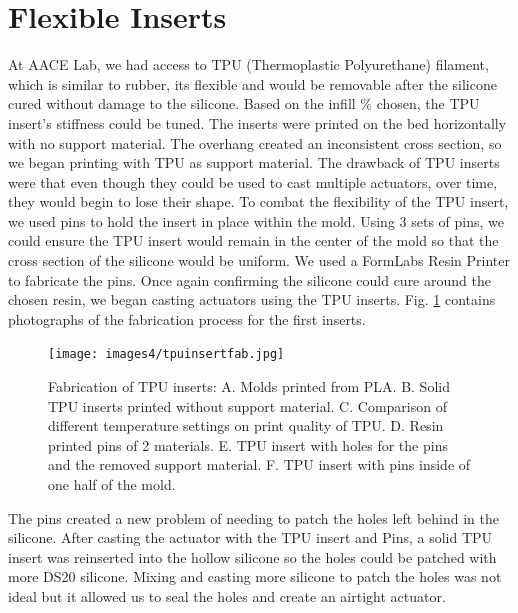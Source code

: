 \section{Flexible Inserts}
At AACE Lab, we had access to TPU (Thermoplastic Polyurethane) filament, which is similar to rubber, its flexible and would be removable after the silicone cured without damage to the silicone. Based on the infill \% chosen, the TPU insert's stiffness could be tuned. The inserts were printed on the bed horizontally with no support material. The overhang created an inconsistent cross section, so we began printing with TPU as support material. The drawback of TPU inserts were that even though they could be used to cast multiple actuators, over time, they would begin to lose their shape. To combat the flexibility of the TPU insert, we used pins to hold the insert in place within the mold. Using 3 sets of pins, we could ensure the TPU insert would remain in the center of the mold so that the cross section of the silicone would be uniform. We used a FormLabs Resin Printer to fabricate the pins. Once again confirming the silicone could cure around the chosen resin, we began casting actuators using the TPU inserts. Fig. \ref{fig:tpuinsert} contains photographs of the fabrication process for the first inserts. 

\begin{figure}[h]
    \centering
    \texttt{[image: images4/tpuinsertfab.jpg]}
    \caption{Fabrication of TPU inserts: A. Molds printed from PLA. B. Solid TPU inserts printed without support material. C. Comparison of different temperature settings on print quality of TPU. D. Resin printed pins of 2 materials. E. TPU insert with holes for the pins and the removed support material. F. TPU insert with pins inside of one half of the mold.}
    \label{fig:tpuinsert}
\end{figure}

The pins created a new problem of needing to patch the holes left behind in the silicone. After casting the actuator with the TPU insert and Pins, a solid TPU insert was reinserted into the hollow silicone so the holes could be patched with more DS20 silicone. Mixing and casting more silicone to patch the holes was not ideal but it allowed us to seal the holes and create an airtight actuator. 

